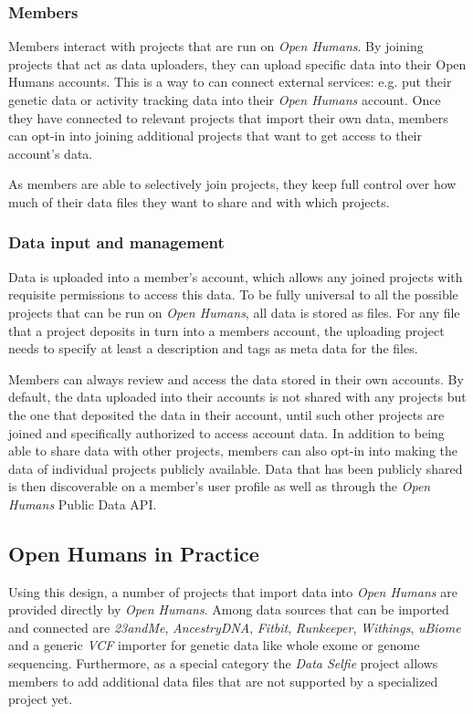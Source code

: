 \documentclass[a4paper,num-refs]{oup-contemporary}
\begin{document}
\subsubsection{Members}
Members interact with projects that are run on \textit{Open Humans}. By joining projects that act as data uploaders, they can upload specific data into their Open Humans accounts. This is a way to can connect external services: e.g. put their genetic data or activity tracking data into their \textit{Open Humans} account. Once they have connected to relevant projects that import their own data, members can opt-in into joining additional projects that want to get access to their account's data.

As members are able to selectively join projects, they keep full control over how much of their data files they want to share and with which projects. 

\subsubsection{Data input and management}
Data is uploaded into a member's account, which allows any joined projects with requisite permissions to access this data. To be fully universal to all the possible projects that can be run on \textit{Open Humans}, all data is stored as files. For any file that a project deposits in turn into a members account, the uploading project needs to specify at least a description and tags as meta data for the files. 

Members can always review and access the data stored in their own accounts. By default, the data uploaded into their accounts is not shared with any projects but the one that deposited the data in their account, until such other projects are joined and specifically authorized to access account data. In addition to being able to share data with other projects, members can also opt-in into making the data of individual projects publicly available. Data that has been publicly shared is then discoverable on a member's user profile as well as through the \textit{Open Humans} Public Data API. 

\subsection{Open Humans in Practice}
Using this design, a number of projects that import data into \textit{Open Humans} are provided directly by \textit{Open Humans}. Among data sources that can be imported and connected are \textit{23andMe}, \textit{AncestryDNA}, \textit{Fitbit}, \textit{Runkeeper}, \textit{Withings}, \textit{uBiome} and a generic \textit{VCF} importer for genetic data like whole exome or genome sequencing. Furthermore, as a special category the \textit{Data Selfie} project allows members to add additional data files that are not supported by a specialized project yet.
\end{document}
